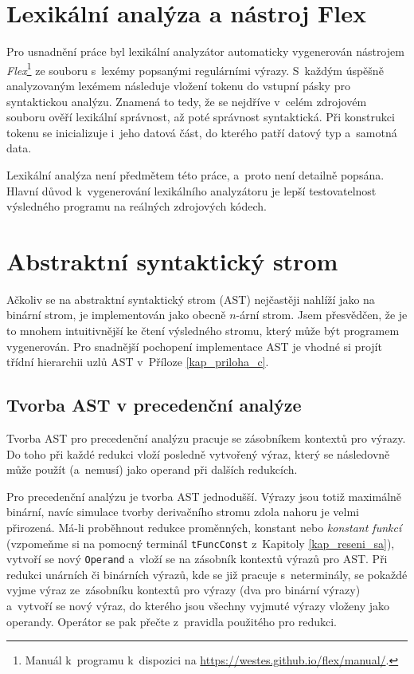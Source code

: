 \section{Lexikální analýza a nástroj Flex}
Pro usnadnění práce byl lexikální analyzátor automaticky vygenerován nástrojem \emph{Flex}\footnote{Manuál k~programu k~dispozici na \href{https://westes.github.io/flex/manual/}{https://westes.github.io/flex/manual/}.} ze souboru s~lexémy popsanými regulárními výrazy.
S~každým úspěšně analyzovaným lexémem následuje vložení tokenu do vstupní pásky pro syntaktickou analýzu.
Znamená to tedy, že se nejdříve v~celém zdrojovém souboru ověří lexikální správnost, až poté správnost syntaktická. 
Při konstrukci tokenu se inicializuje i~jeho datová část, do kterého patří datový typ a~samotná data.

Lexikální analýza není předmětem této práce, a~proto není detailně popsána.
Hlavní důvod k~vygenerování lexikálního analyzátoru je lepší testovatelnost výsledného programu na reálných zdrojových kódech.

\section{Abstraktní syntaktický strom}
Ačkoliv se na abstraktní syntaktický strom (AST) nejčastěji nahlíží jako na binární strom, je implementován jako obecně $n$-ární strom.
Jsem přesvědčen, že je to mnohem intuitivnější ke čtení výsledného stromu, který může být programem vygenerován.
Pro snadnější pochopení implementace AST je vhodné si projít třídní hierarchii uzlů AST v~Příloze \ref{kap_priloha_c}.

\subsection*{Tvorba AST v precedenční analýze}
Tvorba AST pro precedenční analýzu pracuje se zásobníkem kontextů pro výrazy.
Do toho při každé redukci vloží posledně vytvořený výraz, který se následovně může použít (a~nemusí) jako operand při dalších redukcích.

Pro precedenční analýzu je tvorba AST jednodušší.
Výrazy jsou totiž maximálně binární, navíc simulace tvorby derivačního stromu zdola nahoru je velmi přirozená.
Má-li proběhnout redukce proměnných, konstant nebo \emph{konstant funkcí} (vzpomeňme si na pomocný terminál \texttt{tFuncConst} z~Kapitoly \ref{kap_reseni_sa}), vytvoří se nový \texttt{Operand} a~vloží se na zásobník kontextů výrazů pro AST.
Při redukci unárních či binárních výrazů, kde se již pracuje s~neterminály, se pokaždé vyjme výraz ze~zásobníku kontextů pro výrazy (dva pro binární výrazy) a~vytvoří se nový výraz, do kterého jsou všechny vyjmuté výrazy vloženy jako operandy.
Operátor se pak přečte z~pravidla použitého pro redukci.


